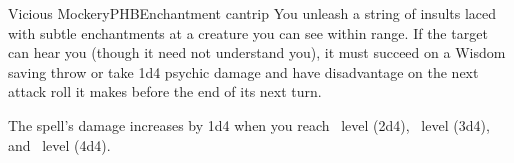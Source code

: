 \begin{spell}{Vicious Mockery}{PHB}{Enchantment cantrip}
{
}
You unleash a string of insults laced with subtle enchantments
at a creature you can see within range. If the target can hear
you (though it need not understand you), it must succeed on a
Wisdom saving throw or take 1d4 psychic damage and have
disadvantage on the next attack roll it makes before the end
of its next turn.

 The spell's damage increases by 1d4
when you reach ~level (2d4), ~level (3d4),
and ~level (4d4).
\end{spell}
